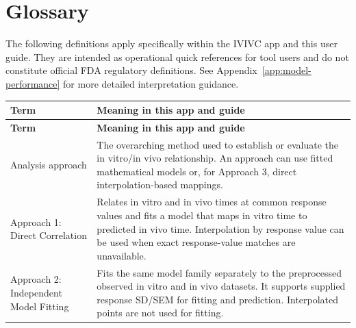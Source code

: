 \section{Glossary}
\label{app:glossary}

The following definitions apply specifically within the IVIVC app and this user guide. They are intended as operational quick references for tool users and do not constitute official FDA regulatory definitions. See Appendix~\ref{app:model-performance} for more detailed interpretation guidance.

\begin{longtable}{@{}>{\raggedright\arraybackslash}p{}>{\raggedright\arraybackslash}p{}@{}}
\toprule
\textbf{Term} & \textbf{Meaning in this app and guide} \\
\midrule
\endfirsthead
\toprule
\textbf{Term} & \textbf{Meaning in this app and guide} \\
\midrule
\endhead




Analysis approach & The overarching method used to establish or evaluate the in vitro/in vivo relationship. An approach can use fitted mathematical models or, for Approach 3, direct interpolation-based mappings. \\

Approach 1: Direct Correlation & Relates in vitro and in vivo times at common response values and fits a model that maps in vitro time to predicted in vivo time. Interpolation by response value can be used when exact response-value matches are unavailable. \\

Approach 2: Independent Model Fitting & Fits the same model family separately to the preprocessed observed in vitro and in vivo datasets. It supports supplied response SD/SEM for fitting and prediction. Interpolated points are not used for fitting. \\


\end{longtable}
